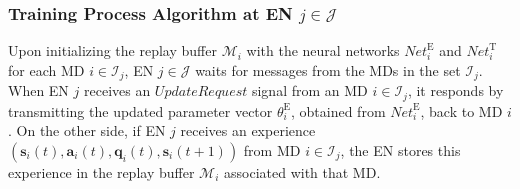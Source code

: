 \documentclass[12pt,draftclsnofoot,onecolumn]{IEEEtran}
\begin{document}
\subsubsection{Training Process Algorithm at EN $j \in \mathcal{J}$}
Upon initializing the replay buffer $\mathcal{M}_i$ with the neural networks $\textit{Net}_i^{\text{E}}$ and $\textit{Net}_i^{\text{T}}$ for each MD $i \in \mathcal{I}_j$, EN $j \in \mathcal{J}$ waits for messages from the MDs in the set $\mathcal{I}_j$. When EN $j$ receives an $\textit{UpdateRequest}$ signal from an MD $i \in \mathcal{I}_j$, it responds by transmitting the updated parameter vector $\theta^{\text{E}}_i$, obtained from $\textit{Net}_i^{\text{E}}$, back to MD $i$. On the other side, if EN $j$ receives an experience $(\boldsymbol{s}_i(t), \boldsymbol{a}_i(t), \boldsymbol{q}_i(t), \boldsymbol{s}_i(t+1))$ from MD $i \in \mathcal{I}_j$, the EN stores this experience in the replay buffer $\mathcal{M}_i$ associated with that MD. %
\end{document}
